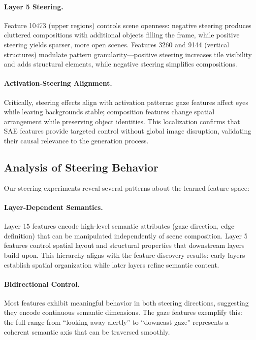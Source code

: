 \documentclass{article}
\begin{document}
\paragraph{Layer 5 Steering.}
Feature 10473 (upper regions) controls scene openness: negative steering produces cluttered compositions with additional objects filling the frame, while positive steering yields sparser, more open scenes. Features 3260 and 9144 (vertical structures) modulate pattern granularity---positive steering increases tile visibility and adds structural elements, while negative steering simplifies compositions.

\paragraph{Activation-Steering Alignment.}
Critically, steering effects align with activation patterns: gaze features affect eyes while leaving backgrounds stable; composition features change spatial arrangement while preserving object identities. This localization confirms that SAE features provide targeted control without global image disruption, validating their causal relevance to the generation process.

\subsection{Analysis of Steering Behavior}

Our steering experiments reveal several patterns about the learned feature space:

\paragraph{Layer-Dependent Semantics.}
Layer 15 features encode high-level semantic attributes (gaze direction, edge definition) that can be manipulated independently of scene composition. Layer 5 features control spatial layout and structural properties that downstream layers build upon. This hierarchy aligns with the feature discovery results: early layers establish spatial organization while later layers refine semantic content.

\paragraph{Bidirectional Control.}
Most features exhibit meaningful behavior in both steering directions, suggesting they encode continuous semantic dimensions. The gaze features exemplify this: the full range from ``looking away alertly'' to ``downcast gaze'' represents a coherent semantic axis that can be traversed smoothly.
\end{document}
